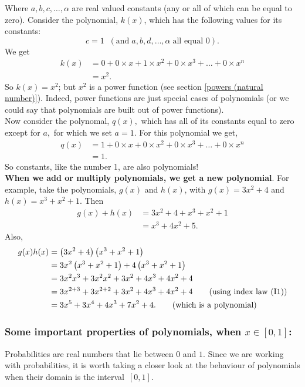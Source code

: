 \noindent Where $a,b,c,\ldots,\alpha$ are real valued constants (any or all of which can be equal to zero). Consider the polynomial, $k(x)$, which has the following values for its constants:
\[
c = 1 \;\; (\text{and} \; a,b,d,\ldots,\alpha \; \text{all equal $0$}).
\]
We get
\begin{align*}
k(x) & = 0 + 0\times x + 1\times x^2 + 0\times x^3 + \ldots+ 0 \times x^n \\
       & = x^2.
\end{align*}
So $k(x) = x^2$; but $x^2$ is a power function (see section \ref{powers (natural number)}). Indeed, power functions are just special cases of polynomials (or we could say that polynomials are built out of power functions). \\

\noindent Now consider the polynomal, $q(x),$ which has all of its constants equal to zero except for $a,$ for which we set $a = 1$. For this polynomial we get,
\begin{align*}
q(x)  & = 1 + 0\times x + 0 \times x^2 + 0 \times x^3 + \ldots + 0\times x^n \\
	& = 1.
\end{align*}
So constants, like the number 1, are also polynomials! \\


\noindent  \textbf{When we add or multiply polynomials, we get a new polynomial}. For example, take the polynomials, $g(x)$ and $h(x)$, with $g(x) = 3x^2 + 4$ and $h(x) = x^3 + x^2 + 1$. Then 
\begin{align*}
g(x) + h(x) & = 3x^2 + 4 + x^3 + x^2 + 1  \\
		 & = x^3 + 4x^2 + 5. \tag{which is a polynomial} 
\end{align*}
Also,
\begin{align*}
g(x)h(x) & =  \left(3x^2 + 4\right)\left(x^3 + x^2 + 1\right) \\
	      & = 3x^2\left(x^3 + x^2 + 1\right) + 4\left(x^3 + x^2 + 1\right) \\
	      & = 3x^2x^3 + 3x^2x^2 + 3x^2 + 4x^3 + 4x^2 + 4 \\
	      & = 3x^{2+3} + 3x^{2+2} + 3x^2 + 4x^3 + 4x^2 + 4 \tag{using index law (I1)} \\
	      & = 3x^5 + 3x^4 + 4x^3 + 7x^2 + 4. \tag{which is a polynomial}
\end{align*}

\subsubsection{Some important properties of polynomials, when $x \in [0,1]$:}
Probabilities are real numbers that lie between $0$ and $1$. Since we are working with probabilities, it is worth taking a closer look at the behaviour of polynomials when their domain is the interval~$[0,1].$ \\


